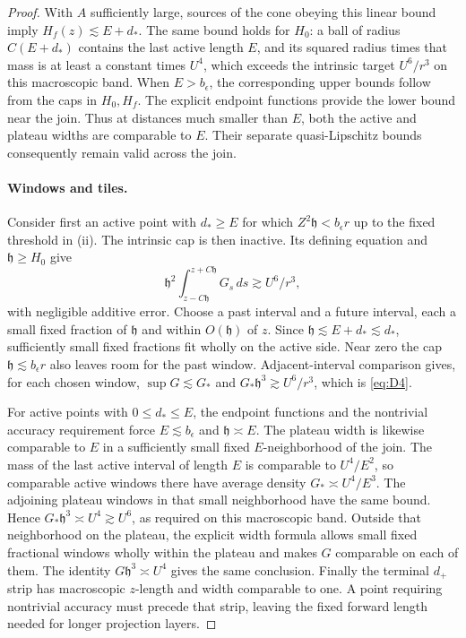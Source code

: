 \begin{proof}
With $A$ sufficiently large, sources of the cone obeying this linear
bound imply $H_f(z)\lesssim E+d_*$.  The same bound holds for $H_0$:
a ball of radius $C(E+d_*)$ contains the last active length $E$, and
its squared radius times that mass is at least a constant times $U^4$,
which exceeds the intrinsic target $U^6/r^3$ on this macroscopic band.
When $E>b_\epsilon$, the corresponding upper bounds follow from the
caps in $H_0,H_f$.  The explicit endpoint functions provide the lower
bound near the join.  Thus at distances much smaller than $E$, both
the active and plateau widths are comparable to $E$.  Their separate
quasi-Lipschitz bounds consequently remain valid across the join.

\paragraph{Windows and tiles.}
Consider first an active point with $d_*\ge E$ for which
$Z^2\mathfrak h<b_\epsilon r$ up to the fixed threshold in (ii).
The intrinsic cap is then inactive.  Its defining equation and
$\mathfrak h\ge H_0$ give
\[
 \mathfrak h^2\int_{z-C\mathfrak h}^{z+C\mathfrak h}G_s\,ds
       \gtrsim U^6/r^3,
\]
with negligible additive error.  Choose a past interval and a future
interval, each a small fixed fraction of $\mathfrak h$ and within
$O(\mathfrak h)$ of $z$.  Since
$\mathfrak h\lesssim E+d_*\lesssim d_*$, sufficiently small fixed
fractions fit wholly on the active side.  Near zero the cap
$\mathfrak h\lesssim b_\epsilon r$ also leaves room for the past
window.  Adjacent-interval comparison gives, for each chosen window,
$\sup G\lesssim G_*$ and
$G_*\mathfrak h^3\gtrsim U^6/r^3$, which is \eqref{eq:D4}.

For active points with $0\le d_*\le E$, the endpoint functions
and the nontrivial accuracy requirement force $E\lesssim b_\epsilon$
and $\mathfrak h\asymp E$.  The plateau width is likewise comparable
to $E$ in a sufficiently small fixed $E$-neighborhood of the join.
The mass of the last active interval of length $E$ is comparable to
$U^4/E^2$, so comparable active windows there have average density
$G_*\asymp U^4/E^3$.  The adjoining plateau windows in that small
neighborhood have the same bound.  Hence
$G_*\mathfrak h^3\asymp U^4\gtrsim U^6$, as required on this
macroscopic band.  Outside that neighborhood on the plateau, the
explicit width formula allows small fixed fractional windows wholly
within the plateau and makes $G$ comparable on each of them.  The
identity $G\mathfrak h^3\asymp U^4$ gives the same conclusion.  Finally the terminal $d_+$ strip has
macroscopic $z$-length and width comparable to one.  A point requiring
nontrivial accuracy must precede that strip, leaving the fixed forward
length needed for longer projection layers.


\end{proof}
